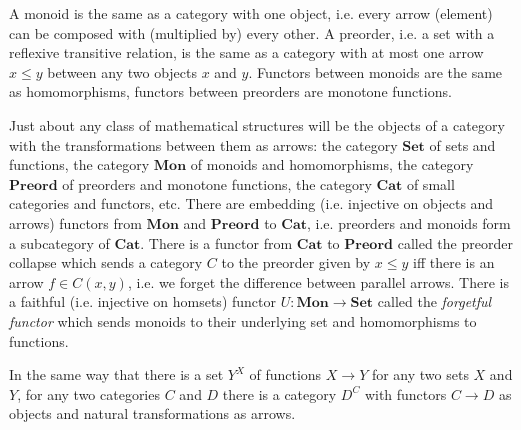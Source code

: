 \begin{example}
A monoid is the same as a category with one object, i.e. every arrow (element) can be composed with (multiplied by) every other.
A preorder, i.e. a set with a reflexive transitive relation, is the same as a category with at most one arrow $x \leq y$ between any two objects $x$ and $y$.
Functors between monoids are the same as homomorphisms, functors between preorders are monotone functions.
\end{example}

\begin{example}
Just about any class of mathematical structures will be the objects of a category with the transformations between them as arrows: the category $\mathbf{Set}$ of sets and functions, the category $\mathbf{Mon}$ of monoids and homomorphisms, the category $\mathbf{Preord}$ of preorders and monotone functions, the category $\mathbf{Cat}$ of small categories and functors, etc.
There are embedding (i.e. injective on objects and arrows) functors from $\mathbf{Mon}$ and $\mathbf{Preord}$ to $\mathbf{Cat}$, i.e. preorders and monoids form a subcategory of $\mathbf{Cat}$.
There is a functor from $\mathbf{Cat}$ to $\mathbf{Preord}$ called the preorder collapse which sends a category $C$ to the preorder given by $x \leq y$ iff there is an arrow $f \in C(x, y)$, i.e. we forget the difference between parallel arrows.
There is a faithful (i.e. injective on homsets) functor $U : \mathbf{Mon} \to \mathbf{Set}$ called the \emph{forgetful functor} which sends monoids to their underlying set and homomorphisms to functions.
\end{example}

\begin{example}
In the same way that there is a set $Y^X$ of functions $X \to Y$ for any two sets $X$ and $Y$, for any two categories $C$ and $D$ there is a category $D^C$ with functors $C \to D$ as objects and natural transformations as arrows.
\end{example}

